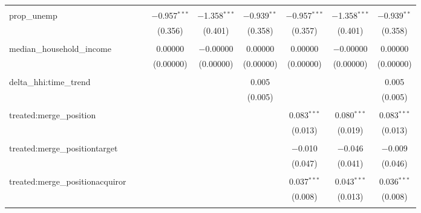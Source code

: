 \begin{table}[H]
{\begin{tabular}{@{\extracolsep{5pt}}lcccccccc}
   & & & & & & & & \\  

  prop\_unemp &  &  & $-$0.957$^{***}$ & $-$1.358$^{***}$ & $-$0.939$^{**}$ & $-$0.957$^{***}$ & $-$1.358$^{***}$ & $-$0.939$^{**}$ \\  

   &  &  & (0.356) & (0.401) & (0.358) & (0.357) & (0.401) & (0.358) \\  

   & & & & & & & & \\  

  median\_household\_income &  &  & 0.00000 & $-$0.00000 & 0.00000 & 0.00000 & $-$0.00000 & 0.00000 \\  

   &  &  & (0.00000) & (0.00000) & (0.00000) & (0.00000) & (0.00000) & (0.00000) \\  

   & & & & & & & & \\  

  delta\_hhi:time\_trend &  &  &  &  & 0.005 &  &  & 0.005 \\  

   &  &  &  &  & (0.005) &  &  & (0.005) \\  

   & & & & & & & & \\  

  treated:merge\_position &  &  &  &  &  & 0.083$^{***}$ & 0.080$^{***}$ & 0.083$^{***}$ \\  

   &  &  &  &  &  & (0.013) & (0.019) & (0.013) \\  

   & & & & & & & & \\  

  treated:merge\_positiontarget &  &  &  &  &  & $-$0.010 & $-$0.046 & $-$0.009 \\  

   &  &  &  &  &  & (0.047) & (0.041) & (0.046) \\  

   & & & & & & & & \\  

  treated:merge\_positionacquiror &  &  &  &  &  & 0.037$^{***}$ & 0.043$^{***}$ & 0.036$^{***}$ \\  

   &  &  &  &  &  & (0.008) & (0.013) & (0.008) \\  

   & & & & & & & & \\  


\end{tabular}}
\end{table}
